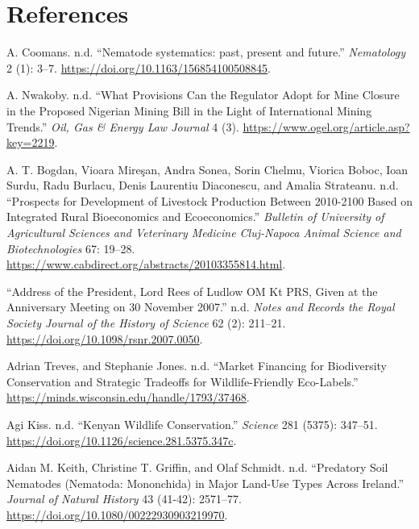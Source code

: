 \section{References}\label{references}

\protect{}\label{refs}
\begin{CSLReferences}{1}{0}
A. Coomans. n.d. {``Nematode systematics: past, present and future.''}
\emph{Nematology} 2 (1): 3--7.
\url{https://doi.org/10.1163/156854100508845}.

A. Nwakoby. n.d. {``What Provisions Can the Regulator Adopt for Mine
Closure in the Proposed Nigerian Mining Bill in the Light of
International Mining Trends.''} \emph{Oil, Gas \& Energy Law Journal} 4
(3). \url{https://www.ogel.org/article.asp?key=2219}.

A. T. Bogdan, Vioara Mireşan, Andra Sonea, Sorin Chelmu, Viorica Boboc,
Ioan Surdu, Radu Burlacu, Denis Laurentiu Diaconescu, and Amalia
Strateanu. n.d. {``Prospects for Development of Livestock Production
Between 2010-2100 Based on Integrated Rural Bioeconomics and
Ecoeconomics.''} \emph{Bulletin of University of Agricultural Sciences
and Veterinary Medicine Cluj-Napoca Animal Science and Biotechnologies}
67: 19--28. \url{https://www.cabdirect.org/abstracts/20103355814.html}.

{``Address of the President, Lord Rees of Ludlow OM Kt PRS, Given at the
Anniversary Meeting on 30 November 2007.''} n.d. \emph{Notes and Records
the Royal Society Journal of the History of Science} 62 (2): 211--21.
\url{https://doi.org/10.1098/rsnr.2007.0050}.

Adrian Treves, and Stephanie Jones. n.d. {``Market Financing for
Biodiversity Conservation and Strategic Tradeoffs for Wildlife-Friendly
Eco-Labels.''} \url{https://minds.wisconsin.edu/handle/1793/37468}.

Agi Kiss. n.d. {``Kenyan Wildlife Conservation.''} \emph{Science} 281
(5375): 347--51. \url{https://doi.org/10.1126/science.281.5375.347c}.

Aidan M. Keith, Christine T. Griffin, and Olaf Schmidt. n.d.
{``Predatory Soil Nematodes (Nematoda: Mononchida) in Major Land-Use
Types Across Ireland.''} \emph{Journal of Natural History} 43 (41-42):
2571--77. \url{https://doi.org/10.1080/00222930903219970}.


\end{CSLReferences}
